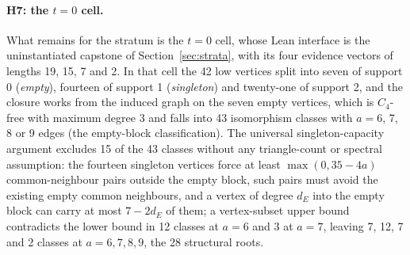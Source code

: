 \documentclass{anvil-paper}
\theoremstyle{definition}
\begin{document}
\paragraph{H7: the $t=0$ cell.} What remains for the stratum is the $t=0$ cell, whose Lean interface is the uninstantiated capstone  of Section~\ref{sec:strata}, with its four evidence vectors of lengths 19, 15, 7 and 2. In that cell the 42 low vertices split into seven of support 0 (\emph{empty}), fourteen of support 1 (\emph{singleton}) and twenty-one of support 2, and the closure works from the induced graph on the seven empty vertices, which is $C_4$-free with maximum degree 3 and falls into 43 isomorphism classes with $a=6$, 7, 8 or 9 edges (the empty-block classification). The universal singleton-capacity argument excludes 15 of the 43 classes without any triangle-count or spectral assumption: the fourteen singleton vertices force at least $\max(0,35-4a)$ common-neighbour pairs outside the empty block, such pairs must avoid the existing empty common neighbours, and a vertex of degree $d_E$ into the empty block can carry at most $7-2d_E$ of them; a vertex-subset upper bound contradicts the lower bound in 12 classes at $a=6$ and 3 at $a=7$, leaving 7, 12, 7 and 2 classes at $a=6,7,8,9$, the 28 structural roots.
\end{document}
